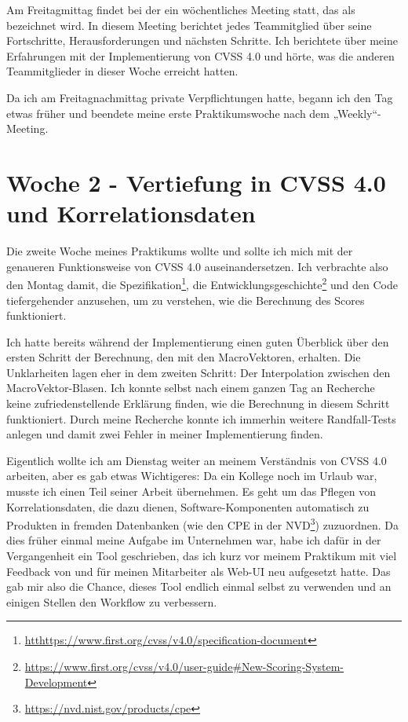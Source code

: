 Am Freitagmittag findet bei der \metaeffekt ein wöchentliches Meeting statt, das als  bezeichnet wird.
In diesem Meeting berichtet jedes Teammitglied über seine Fortschritte, Herausforderungen und nächsten Schritte.
Ich berichtete über meine Erfahrungen mit der Implementierung von CVSS 4.0 und hörte, was die anderen Teammitglieder in dieser Woche erreicht hatten.

Da ich am Freitagnachmittag private Verpflichtungen hatte, begann ich den Tag etwas früher und beendete meine erste Praktikumswoche nach dem „Weekly“-Meeting.


\section{Woche 2 - Vertiefung in CVSS 4.0 und Korrelationsdaten} \label{sec:bericht-wo-2}

Die zweite Woche meines Praktikums wollte und sollte ich mich mit der genaueren Funktionsweise von CVSS 4.0 auseinandersetzen.
Ich verbrachte also den Montag damit, die Spezifikation\footnote{\url{htthttps://www.first.org/cvss/v4.0/specification-document}},
die Entwicklungsgeschichte\footnote{\url{https://www.first.org/cvss/v4.0/user-guide#New-Scoring-System-Development}}
und den Code tiefergehender anzusehen, um zu verstehen, wie die Berechnung des Scores funktioniert.

Ich hatte bereits während der Implementierung einen guten Überblick über den ersten Schritt der Berechnung, den mit den MacroVektoren, erhalten.
Die Unklarheiten lagen eher in dem zweiten Schritt: Der Interpolation zwischen den MacroVektor-Blasen.
Ich konnte selbst nach einem ganzen Tag an Recherche keine zufriedenstellende Erklärung finden, wie die Berechnung in diesem Schritt funktioniert.
Durch meine Recherche konnte ich immerhin weitere Randfall-Tests anlegen und damit zwei Fehler in meiner Implementierung finden.

Eigentlich wollte ich am Dienstag weiter an meinem Verständnis von CVSS 4.0 arbeiten, aber es gab etwas Wichtigeres:
Da ein Kollege noch im Urlaub war, musste ich einen Teil seiner Arbeit übernehmen.
Es geht um das Pflegen von Korrelationsdaten, die dazu dienen, Software-Komponenten automatisch zu Produkten in fremden Datenbanken (wie den CPE in der NVD\footnote{\url{https://nvd.nist.gov/products/cpe}}) zuzuordnen.
Da dies früher einmal meine Aufgabe im Unternehmen war, habe ich dafür in der Vergangenheit ein Tool geschrieben, das ich kurz vor meinem Praktikum mit viel Feedback von und für meinen Mitarbeiter als Web-UI neu aufgesetzt hatte.
Das gab mir also die Chance, dieses Tool endlich einmal selbst zu verwenden und an einigen Stellen den Workflow zu verbessern.

